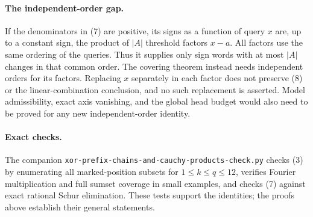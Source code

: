 \documentclass[11pt]{article}
\begin{document}
\paragraph{The independent-order gap.}
If the denominators in (7) are positive, its signs as a function of
query $x$ are, up to a constant sign, the product of $|A|$ threshold
factors $x-a$. All factors use the same ordering of the queries.
Thus it supplies only sign words with at most $|A|$ changes in that
common order. The covering theorem instead needs independent orders
for its factors. Replacing $x$ separately in each factor does not
preserve (8) or the linear-combination conclusion, and no such
replacement is asserted. Model admissibility, exact axis vanishing,
and the global head budget would also need to be proved for any new
independent-order identity.

\paragraph{Exact checks.}
The companion \texttt{xor-prefix-chains-and-cauchy-products-check.py}
checks (3) by enumerating all marked-position subsets for
$1\leq k\leq q\leq12$, verifies Fourier multiplication and full
sumset coverage in small examples, and checks (7) against exact
rational Schur elimination. These tests support the identities;
the proofs above establish their general statements.
\end{document}
